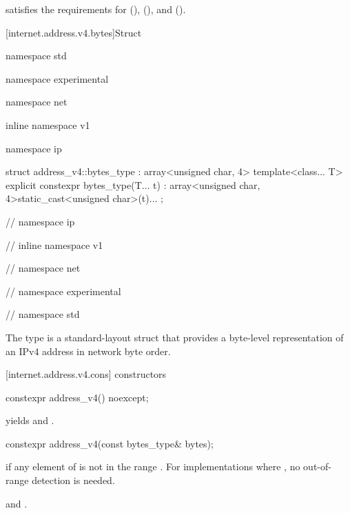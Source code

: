 \pnum
{} satisfies the requirements for  (),  (), and  ().


[internet.address.v4.bytes]{Struct }

%
\begin{codeblock}
namespace std {
namespace experimental {
namespace net {
inline namespace v1 {
namespace ip {

  struct address_v4::bytes_type : array<unsigned char, 4>
  {
    template<class... T> explicit constexpr bytes_type(T... t)
      : array<unsigned char, 4>{{static_cast<unsigned char>(t)...}} {}
  };

} // namespace ip
} // inline namespace v1
} // namespace net
} // namespace experimental
} // namespace std
\end{codeblock}

\pnum
The  type is a standard-layout struct that provides a byte-level representation of an IPv4 address in network byte order.



%
[internet.address.v4.cons]{ constructors}

\begin{itemdecl}
constexpr address_v4() noexcept;
\end{itemdecl}

\begin{itemdescr}
\pnum
\postconditions {} yields  and .
\end{itemdescr}

\begin{itemdecl}
constexpr address_v4(const bytes_type& bytes);
\end{itemdecl}

\begin{itemdescr}
\pnum
\remarks {} if any element of  is not in the range \tcode{[0, 0xFF]}. \enternote For implementations where , no out-of-range detection is needed. \exitnote

\pnum
\postconditions {} and .
\end{itemdescr}

